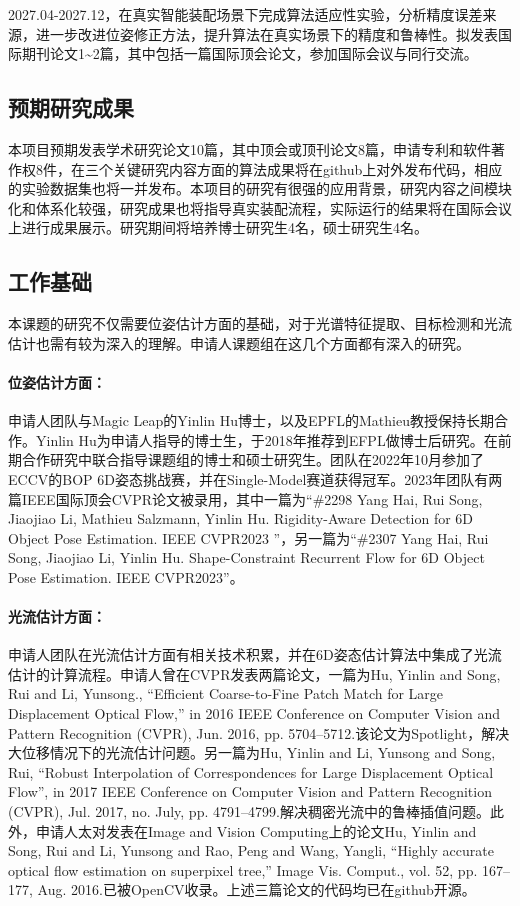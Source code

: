 \documentclass[12pt]{article}
\newcommand{\myPara}[1]{\paragraph{#1：}}
\begin{document}
2027.04-2027.12，在真实智能装配场景下完成算法适应性实验，分析精度误差来源，进一步改进位姿修正方法，提升算法在真实场景下的精度和鲁棒性。拟发表国际期刊论文1\textasciitilde2篇，其中包括一篇国际顶会论文，参加国际会议与同行交流。

\subsection{预期研究成果}

本项目预期发表学术研究论文10篇，其中顶会或顶刊论文8篇，申请专利和软件著作权8件，在三个关键研究内容方面的算法成果将在github上对外发布代码，相应的实验数据集也将一并发布。本项目的研究有很强的应用背景，研究内容之间模块化和体系化较强，研究成果也将指导真实装配流程，实际运行的结果将在国际会议上进行成果展示。研究期间将培养博士研究生4名，硕士研究生4名。



\subsection{工作基础}


本课题的研究不仅需要位姿估计方面的基础，对于光谱特征提取、目标检测和光流估计也需有较为深入的理解。申请人课题组在这几个方面都有深入的研究。
\myPara{位姿估计方面}
申请人团队与Magic Leap的Yinlin Hu博士，以及EPFL的Mathieu教授保持长期合作。Yinlin Hu为申请人指导的博士生，于2018年推荐到EFPL做博士后研究。在前期合作研究中联合指导课题组的博士和硕士研究生。团队在2022年10月参加了ECCV的BOP 6D姿态挑战赛，并在Single-Model赛道获得冠军。2023年团队有两篇IEEE国际顶会CVPR论文被录用，其中一篇为“\#2298 Yang Hai, Rui Song, Jiaojiao Li, Mathieu Salzmann, Yinlin Hu. Rigidity-Aware Detection for 6D Object Pose Estimation. IEEE CVPR2023 ”，另一篇为“\#2307 Yang Hai, Rui Song, Jiaojiao Li, Yinlin Hu. Shape-Constraint Recurrent Flow for 6D Object Pose Estimation. IEEE CVPR2023”。

\myPara{光流估计方面}
申请人团队在光流估计方面有相关技术积累，并在6D姿态估计算法中集成了光流估计的计算流程。申请人曾在CVPR发表两篇论文，一篇为Hu, Yinlin and Song, Rui and Li, Yunsong., “Efficient Coarse-to-Fine Patch Match for Large Displacement Optical Flow,” in 2016 IEEE Conference on Computer Vision and Pattern Recognition (CVPR), Jun. 2016, pp. 5704–5712.该论文为Spotlight，解决大位移情况下的光流估计问题。另一篇为Hu, Yinlin and Li, Yunsong and Song, Rui, “Robust Interpolation of Correspondences for Large Displacement Optical Flow”, in 2017 IEEE Conference on Computer Vision and Pattern Recognition (CVPR), Jul. 2017, no. July, pp. 4791–4799.解决稠密光流中的鲁棒插值问题。此外，申请人太对发表在Image and Vision Computing上的论文Hu, Yinlin and Song, Rui and Li, Yunsong and Rao, Peng and Wang, Yangli, “Highly accurate optical flow estimation on superpixel tree,” Image Vis. Comput., vol. 52, pp. 167–177, Aug. 2016.已被OpenCV收录。上述三篇论文的代码均已在github开源。
\end{document}
